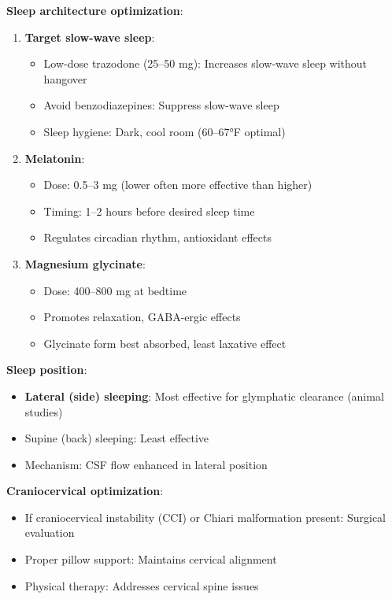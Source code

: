 \textbf{Sleep architecture optimization}:
\begin{enumerate}
    \item \textbf{Target slow-wave sleep}:
    \begin{itemize}
        \item Low-dose trazodone (25--50 mg): Increases slow-wave sleep without hangover
        \item Avoid benzodiazepines: Suppress slow-wave sleep
        \item Sleep hygiene: Dark, cool room (60--67°F optimal)
    \end{itemize}

    \item \textbf{Melatonin}:
    \begin{itemize}
        \item Dose: 0.5--3 mg (lower often more effective than higher)
        \item Timing: 1--2 hours before desired sleep time
        \item Regulates circadian rhythm, antioxidant effects
    \end{itemize}

    \item \textbf{Magnesium glycinate}:
    \begin{itemize}
        \item Dose: 400--800 mg at bedtime
        \item Promotes relaxation, GABA-ergic effects
        \item Glycinate form best absorbed, least laxative effect
    \end{itemize}
\end{enumerate}

\textbf{Sleep position}:
\begin{itemize}
    \item \textbf{Lateral (side) sleeping}: Most effective for glymphatic clearance (animal studies)
    \item Supine (back) sleeping: Least effective
    \item Mechanism: CSF flow enhanced in lateral position
\end{itemize}

\textbf{Craniocervical optimization}:
\begin{itemize}
    \item If craniocervical instability (CCI) or Chiari malformation present: Surgical evaluation
    \item Proper pillow support: Maintains cervical alignment
    \item Physical therapy: Addresses cervical spine issues
\end{itemize}

